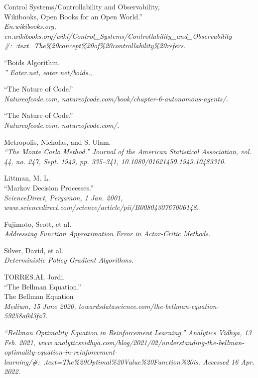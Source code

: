 \begin{thebibliography}{9}
Control Systems/Controllability and Observability,\\
Wikibooks, Open Books for an Open World.” \\
\textit{En.wikibooks.org, en.wikibooks.org/wiki/Control\_Systems/Controllability\_and\_Observability\\\#:~:text=The\%20concept\%20of\%20controllability\%20refers.}

“Boids Algorithm.\\
\textit{” Eater.net, eater.net/boids.},

“The Nature of Code.”\\
\textit{ Natureofcode.com, natureofcode.com/book/chapter-6-autonomous-agents/.}

“The Nature of Code.”\\
\textit{ Natureofcode.com, natureofcode.com/.}

Metropolis, Nicholas, and S. Ulam.\\
\textit{ “The Monte Carlo Method.” Journal of the American Statistical Association, vol. 44, no. 247, Sept. 1949, pp. 335–341, 10.1080/01621459.1949.10483310.}

Littman, M. L.\\
“Markov Decision Processes.”\\
\textit{ ScienceDirect, Pergamon, 1 Jan. 2001,\\ www.sciencedirect.com/science/article/pii/B0080430767006148.}

Fujimoto, Scott, et al.\\
\textit{Addressing Function Approximation Error in Actor-Critic Methods.}


Silver, David, et al.\\
\textit{ Deterministic Policy Gradient Algorithms.}

TORRES.AI, Jordi.\\
“The Bellman Equation.”\\
The Bellman Equation\\
\textit{ Medium, 15 June 2020, towardsdatascience.com/the-bellman-equation-59258a0d3fa7.}


\textit{“Bellman Optimality Equation in Reinforcement Learning.” Analytics Vidhya, 13 Feb. 2021, www.analyticsvidhya.com/blog/2021/02/understanding-the-bellman-optimality-equation-in-reinforcement-learning/\#:~:text=The\%20Optimal\%20Value\%20Function\%20is. Accessed 16 Apr. 2022.}


\end{thebibliography}
